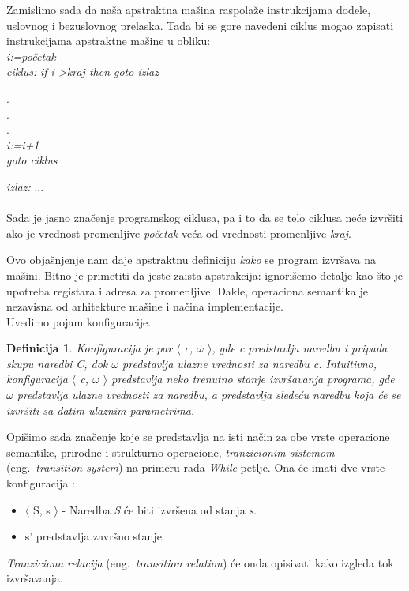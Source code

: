 \documentclass[a4paper]{article}
\newtheorem{definicija}{Definicija}[section]
\begin{document}
{Zamislimo sada da naša apstraktna mašina raspolaže instrukcijama dodele, uslovnog i bezuslovnog prelaska. Tada bi se gore navedeni ciklus mogao zapisati instrukcijama apstraktne mašine u obliku:\\

\hspace{4cm} \textit{i:=početak}\\
\textit{ciklus:} \hspace{3cm} \textit{if i \textgreater kraj then goto izlaz}
\begin{center}
.
\\.
\\.
\\ \textit{i:=i+1}
\\ \textit{goto ciklus}
\end{center}
\textit{izlaz:} \hspace{4cm} ...\\
\\Sada je jasno značenje programskog ciklusa, pa i to da se telo ciklusa neće izvršiti ako je vrednost promenljive \textit{početak} veća od vrednosti promenljive \textit{kraj}.


Ovo objašnjenje nam daje apstraktnu definiciju \textit{kako} se program izvršava na mašini. Bitno je primetiti da jeste zaista apstrakcija: ignorišemo detalje kao što je upotreba registara i adresa za promenljive. Dakle, operaciona semantika je nezavisna od arhitekture mašine i načina implementacije.\\

Uvedimo pojam konfiguracije.
\begin{definicija}
Konfiguracija je par $\langle$ \textit{c, $\omega$} $\rangle$, gde \textit{c} predstavlja naredbu i pripada skupu naredbi \textit{C}, dok $\omega$ predstavlja ulazne vrednosti za naredbu \textit{c}. Intuitivno, konfiguracija $\langle$ \textit{c, $\omega$} $\rangle$ predstavlja neko trenutno stanje izvršavanja programa, gde \textit{$\omega$} predstavlja ulazne vrednosti za naredbu, a  predstavlja sledeću naredbu koja će se izvršiti sa datim ulaznim parametrima. \cite{micko} 
\end{definicija}
Opišimo sada značenje koje se predstavlja na isti način za obe vrste operacione semantike, prirodne i strukturno operacione, \textit{tranzicionim sistemom} (eng.~{\em transition system}) na primeru rada \emph{While} petlje. Ona će imati dve vrste konfiguracija \cite{wiley}:
\begin{itemize}
	\item $\langle$ S, s $\rangle$ - Naredba \textit{S} će biti izvršena od stanja \textit{s}.
	\item s' predstavlja završno stanje.
\end{itemize}
\textit{Tranziciona relacija} (eng.~{\em transition relation}) će onda opisivati kako izgleda tok izvršavanja. \\
 
}
\end{document}
